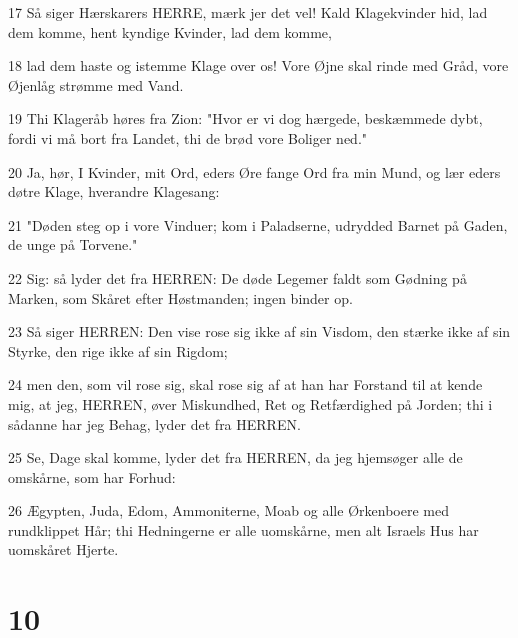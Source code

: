 \par 17 Så siger Hærskarers HERRE, mærk jer det vel! Kald Klagekvinder hid, lad dem komme, hent kyndige Kvinder, lad dem komme,
\par 18 lad dem haste og istemme Klage over os! Vore Øjne skal rinde med Gråd, vore Øjenlåg strømme med Vand.
\par 19 Thi Klageråb høres fra Zion: "Hvor er vi dog hærgede, beskæmmede dybt, fordi vi må bort fra Landet, thi de brød vore Boliger ned."
\par 20 Ja, hør, I Kvinder, mit Ord, eders Øre fange Ord fra min Mund, og lær eders døtre Klage, hverandre Klagesang:
\par 21 "Døden steg op i vore Vinduer; kom i Paladserne, udrydded Barnet på Gaden, de unge på Torvene."
\par 22 Sig: så lyder det fra HERREN: De døde Legemer faldt som Gødning på Marken, som Skåret efter Høstmanden; ingen binder op.
\par 23 Så siger HERREN: Den vise rose sig ikke af sin Visdom, den stærke ikke af sin Styrke, den rige ikke af sin Rigdom;
\par 24 men den, som vil rose sig, skal rose sig af at han har Forstand til at kende mig, at jeg, HERREN, øver Miskundhed, Ret og Retfærdighed på Jorden; thi i sådanne har jeg Behag, lyder det fra HERREN.
\par 25 Se, Dage skal komme, lyder det fra HERREN, da jeg hjemsøger alle de omskårne, som har Forhud:
\par 26 Ægypten, Juda, Edom, Ammoniterne, Moab og alle Ørkenboere med rundklippet Hår; thi Hedningerne er alle uomskårne, men alt Israels Hus har uomskåret Hjerte.

\chapter{10}

